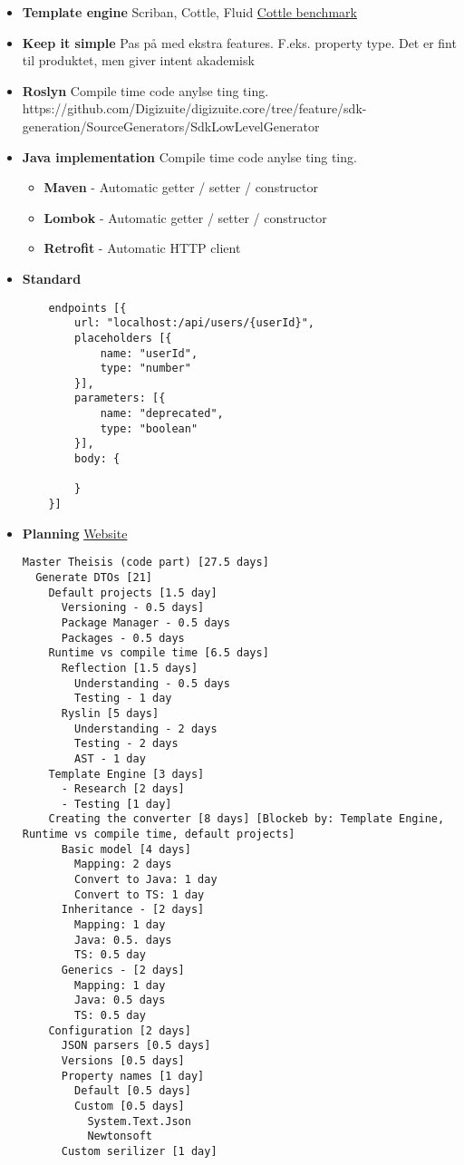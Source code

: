 \begin{itemize}
    \item \textbf{Template engine} Scriban, Cottle, Fluid \hyperlink{https://r3c.github.io/cottle/benchmark.html}{Cottle benchmark}
    
    \item \textbf{Keep it simple} Pas på med ekstra features. F.eks. property type. Det er fint til produktet, men giver intent akademisk

    \item \textbf{Roslyn} Compile time code anylse ting ting.
https://github.com/Digizuite/digizuite.core/tree/feature/sdk-generation/SourceGenerators/SdkLowLevelGenerator

    \item \textbf{Java implementation} Compile time code anylse ting ting.
        \begin{itemize}
            \item \textbf{Maven} - Automatic getter / setter / constructor
            \item \textbf{Lombok} - Automatic getter / setter / constructor
            \item \textbf{Retrofit} - Automatic HTTP client
        \end{itemize}

   \item \textbf{Standard}
\begin{verbatim}
    endpoints [{
        url: "localhost:/api/users/{userId}",
        placeholders [{
            name: "userId",
            type: "number"
        }],
        parameters: [{
            name: "deprecated",
            type: "boolean"
        }],
        body: {
        
        }
    }]
\end{verbatim}

    \item \textbf{Planning} \hyperlink{https://tree.nathanfriend.io/}{Website}
    \begin{verbatim}
Master Theisis (code part) [27.5 days]
  Generate DTOs [21]
    Default projects [1.5 day]
      Versioning - 0.5 days]
      Package Manager - 0.5 days
      Packages - 0.5 days
    Runtime vs compile time [6.5 days]
      Reflection [1.5 days]
        Understanding - 0.5 days
        Testing - 1 day
      Ryslin [5 days]
        Understanding - 2 days
        Testing - 2 days
        AST - 1 day
    Template Engine [3 days]
      - Research [2 days]
      - Testing [1 day]
    Creating the converter [8 days] [Blockeb by: Template Engine, Runtime vs compile time, default projects]
      Basic model [4 days]
        Mapping: 2 days
        Convert to Java: 1 day
        Convert to TS: 1 day
      Inheritance - [2 days]
        Mapping: 1 day
        Java: 0.5. days
        TS: 0.5 day
      Generics - [2 days]
        Mapping: 1 day
        Java: 0.5 days
        TS: 0.5 day
    Configuration [2 days]
      JSON parsers [0.5 days]
      Versions [0.5 days]
      Property names [1 day]
        Default [0.5 days]
        Custom [0.5 days]
          System.Text.Json
          Newtonsoft
      Custom serilizer [1 day]
      

\end{verbatim}
\end{itemize}
